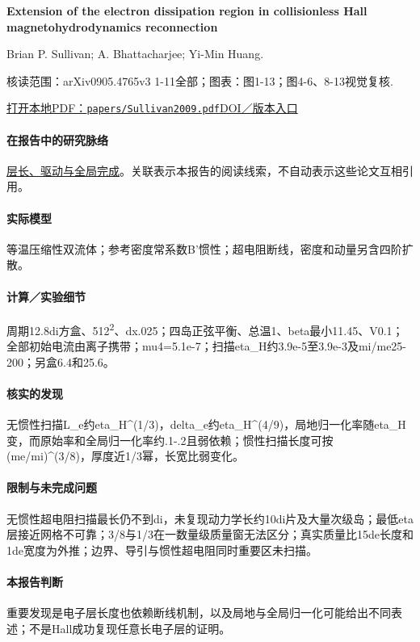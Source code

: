 \textbf{Extension of the electron dissipation region in collisionless Hall magnetohydrodynamics reconnection}\citep{Sullivan2009}\

Brian P. Sullivan;  A. Bhattacharjee;  Yi-Min Huang.

\textsf{核读范围：}arXiv0905.4765v3 1-11全部；\textsf{图表：}图1-13；图4-6、8-13视觉复核.

\href{run:papers/Sullivan2009.pdf}{打开本地PDF：\texttt{papers/Sullivan2009.pdf}}\quad\href{https://doi.org/10.1063/1.3251423}{DOI／版本入口}

\paragraph{在报告中的研究脉络}\hyperref[story:global]{层长、驱动与全局完成}。关联表示本报告的阅读线索，不自动表示这些论文互相引用。

\paragraph{实际模型}等温压缩性双流体；参考密度常系数B'惯性；超电阻断线，密度和动量另含四阶扩散。

\paragraph{计算／实验细节}周期12.8di方盒、512\textsuperscript{2}、dx.025；四岛正弦平衡、总温1、beta最小11.45、V0.1；全部初始电流由离子携带；mu4=5.1e-7；扫描eta\_H约3.9e-5至3.9e-3及mi/me25-200；另盒6.4和25.6。

\paragraph{核实的发现}无惯性扫描L\_e约eta\_H\textasciicircum{}(1/3)，delta\_e约eta\_H\textasciicircum{}(4/9)，局地归一化率随eta\_H变，而原始率和全局归一化率约.1-.2且弱依赖；惯性扫描长度可按(me/mi)\textasciicircum{}(3/8)，厚度近1/3幂，长宽比弱变化。

\paragraph{限制与未完成问题}无惯性超电阻扫描最长仍不到di，未复现动力学长约10di片及大量次级岛；最低eta层接近网格不可靠；3/8与1/3在一数量级质量窗无法区分；真实质量比15de长度和1de宽度为外推；边界、导引与惯性超电阻同时重要区未扫描。

\paragraph{本报告判断}重要发现是电子层长度也依赖断线机制，以及局地与全局归一化可能给出不同表述；不是Hall成功复现任意长电子层的证明。

